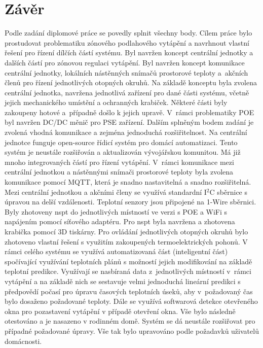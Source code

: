 \chapter{Závěr}
Podle zadání diplomové práce se povedly splnit všechny body. Cílem práce bylo prostudovat problematiku zónového podlahového vytápění a navrhnout vlastní řešení pro řízení dílčích částí systému. Byl navržen koncept centrální jednotky a dalších částí pro zónovou regulaci vytápění. Byl navržen koncept komunikace centrální jednotky, lokálních nástěnných snímačů prostorové teploty a~akčních členů pro řízení jednotlivých otopných okruhů. Na základě konceptu byla zvolena centrální jednotka, navržena jednotlivá zařízení pro dané části systému, včetně jejich mechanického umístění a ochranných krabiček. Některé části byly zakoupeny hotové a~případně došlo k jejich upravě. V~rámci problematiky POE byl navržen DC/DC měnič pro PSE zařízení. Dalším splněným bodem zadání je zvolená vhodná komunikace a zejména jednoduchá rozšiřitelnost. Na centrální jednotce funguje open-source řídicí systém pro domácí automatizaci. Tento systém je neustále rozšiřován a aktualizován vývojářskou komunitou. Má již mnoho integrovaných částí pro řízení vytápění. V~rámci komunikace mezi centrální jednotkou a nástěnnými snímači prostorové teploty byla zvolena komunikace pomocí MQTT, která je snadno nastavitelná a snadno rozšiřitelná. Mezi centrální jednotkou a akčními členy se využívá standardní I$^2$C sběrnice s úpravou na delší vzdálenosti. Teplotní senzory jsou připojené na 1-Wire sběrnici. Byly zhotoveny \acrshort{nspt} do jednotlivých místností ve verzi s POE a WiFi s napájením pomocí síťového adaptéru. Pro \acrshort{nspt} byla navržena a zhotovena krabička pomocí 3D tiskárny. Pro ovládání jednotlivých otopných okruhů bylo zhotoveno vlastní řešení s využitím zakoupených termoelektrických pohonů. V rámci celého systému se využívá automatizovaná část (inteligentní část) spočívající využívání teplotních plánů s možností jejich modifikování na základě teplotní predikce. Využívají se nasbíraná data z~jednotlivých místností v~rámci vytápění a na základě nich se sestavuje velmi jednoduchá lineární predikci s předpovědí počasí pro úpravu časových teplotních úseků, aby v~požadovaný čas bylo dosaženo požadované teploty. Dále se využívá softwarová detekce otevřeného okna pro pozastavení vytápění v případě otevření okna. Vše bylo následně otestováno a je nasazeno v rodinném domě. Systém se dá neustále rozšiřovat pro případné požadované úpravy. Vše tak bylo upravováno podle požadavků uživatelů domácnosti. 

